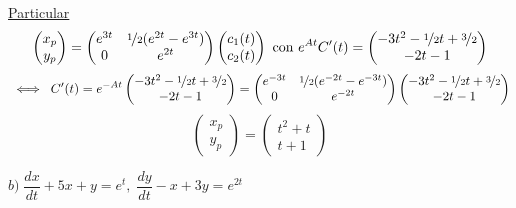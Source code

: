 \begin{ejer}
    \underline{Particular}
    $$\begin{pmatrix}
            x_p \\ y_p
        \end{pmatrix}= \begin{pmatrix}
            e^{3t} & \nicefrac{1}{2}(e^{2t}-e^{3t}) \\ 0 & e^{2t} 
        \end{pmatrix}\begin{pmatrix}
            c_1(t) \\ c_2(t)
        \end{pmatrix} \text{ con } e^{At}C'(t)=\begin{pmatrix}
            -3t^2-\nicefrac{1}{2}t+\nicefrac{3}{2} \\ -2t-1
        \end{pmatrix} $$$$\; \iff \; C'(t)=e^{-At}\begin{pmatrix}
            -3t^2-\nicefrac{1}{2}t+\nicefrac{3}{2} \\ -2t-1
        \end{pmatrix} =\begin{pmatrix}
            e^{-3t} & \nicefrac{1}{2}(e^{-2t}-e^{-3t}) \\ 0 & e^{-2t} 
        \end{pmatrix}\begin{pmatrix}
            -3t^2-\nicefrac{1}{2}t+\nicefrac{3}{2} \\ -2t-1
        \end{pmatrix}$$
        $$\begin{pmatrix}
            x_p \\ y_p
        \end{pmatrix}=\begin{pmatrix}
            t^2+t \\ t+1
        \end{pmatrix}$$

    $b) \; \dfrac{dx}{dt}+5x+y=e^t, \; \dfrac{dy}{dt}-x+3y=e^{2t}$
    \begin{sol}
        

\end{sol}
\end{ejer}
